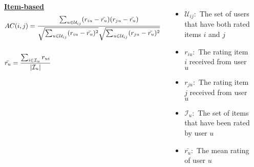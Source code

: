 \begin{frame}
\begin{columns}
\begin{itemize}
        \end{itemize}
        \centering
        \underline{\textbf{Item-based}}
        \begin{equation*}
            \small
            \begin{split}
            &AC(i,j) = \frac{\sum_{u \in \mathcal{U}_{ij}}(r_{iu}-\bar{r_{u}})(r_{ju}-\bar{r_{u}})}
        		    {\sqrt{\sum_{u \in \mathcal{U}_{ij}}(r_{iu}-\bar{r_{u}})^2}
                             \sqrt{\sum_{u \in \mathcal{U}_{ij}}(r_{ju}-\bar{r_{u}})^2}} \\\\
            &\bar{r_{u}} = \frac{\sum_{i \in \mathcal{I}_u}r_{ui}}
         		        {\mathopen|\mathcal{I}_u\mathclose|}
            \end{split}
        \end{equation*}
        \tiny
        \begin{itemize}
            \item $\mathcal{U}_{ij}:$ The set of users that have both rated items $i$ and $j$
            \item $r_{iu}:$ The rating item $i$ received from user $u$
            \item $r_{ju}:$ The rating item $j$ received from user $u$
            \item $\mathcal{I}_{u}:$ The set of items that have been rated by user $u$
            \item $\bar{r_{u}}:$ The mean rating of user $u$
        \end{itemize}
    \end{columns}
\end{frame}
